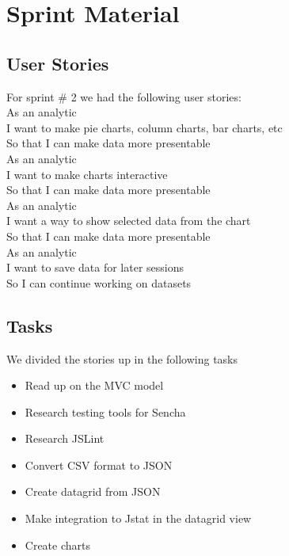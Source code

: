 \section{Sprint Material} %
\label{sec:Sprint Material}
\subsection{User Stories} 
For sprint \# 2 we had the following user stories: \\
As an analytic \\
I want to make pie charts, column charts, bar charts, etc \\
So that I can make data more presentable \\

As an analytic \\
I want to make charts interactive  \\
So that I can make data more presentable \\

As an analytic \\
I want a way to show selected data from the chart \\
So that I can make data more presentable\\

As an analytic \\
I want to save data for later sessions \\
So I can continue working on datasets \\

\subsection{Tasks} %
\label{sub:Tasks}
We divided the stories up in the following tasks
\begin{itemize}
	\item Read up on the MVC model
	\item Research testing tools for Sencha
	\item Research JSLint
	\item Convert CSV format to JSON
	\item Create datagrid from JSON
	\item Make integration to Jstat in the datagrid view
	\item Create charts
\end{itemize}










